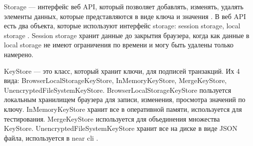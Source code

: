 \begin{figure}
	\centering
    \caption{}
\end{figure}

\begin{definition}
    Storage --- интерфейс веб API, который позволяет добавлять, изменять, удалять элементы данных, которые представляются в виде ключа и значения \cite{webapistorage}. В веб API есть два объекта, которые используют интерфейс storage: session storage, local storage \cite{webapilocalstorage}. Session storage хранит данные до закрытия браузера, когда как данные в local storage не имеют ограничения по времени и могу быть удалены только намерено.
\end{definition}

\begin{definition}
    KeyStore \cite{nearclasskeystore} --- это класс, который хранит ключи, для подписей транзакций. Их 4 вида: BrowserLocalStorageKeyStore, InMemoryKeyStore, MergeKeyStore, UnencryptedFileSystemKeyStore. BrowserLocalStorageKeyStore пользуется локальным хранилищем браузера для записи, изменения, просмотра значений по ключу. InMemoryKeyStore хранит все в оперативной памяти, используется для тестирования. MergeKeyStore используется для объединения множества KeyStore. UnencryptedFileSystemKeyStore хранит все на диске в виде JSON файла, используется в near cli \cite{nearcli}.
\end{definition}

